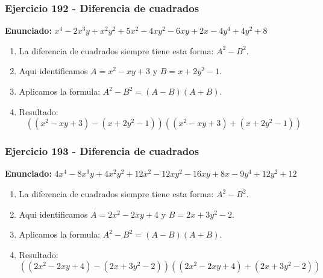 \documentclass[11pt,a4paper]{article}
\begin{document}
\vspace{0.2cm}
\subsubsection*{Ejercicio 192 - Diferencia de cuadrados}
\textbf{Enunciado:} $ x^{4} - 2 x^{3} y + x^{2} y^{2} + 5 x^{2} - 4 x y^{2} - 6 x y + 2 x - 4 y^{4} + 4 y^{2} + 8 $\par
\begin{enumerate}[leftmargin=2em]
\item La diferencia de cuadrados siempre tiene esta forma: \(A^2-B^2\).
\item Aqui identificamos \(A=x^{2} - x y + 3\) y \(B=x + 2 y^{2} - 1\).
\item Aplicamos la formula: \(A^2-B^2=(A-B)(A+B)\).
\item Resultado: \[\boxed{\left(\left(x^{2} - x y + 3\right)-\left(x + 2 y^{2} - 1\right)\right)\left(\left(x^{2} - x y + 3\right)+\left(x + 2 y^{2} - 1\right)\right)}\]
\end{enumerate}

\vspace{0.2cm}
\subsubsection*{Ejercicio 193 - Diferencia de cuadrados}
\textbf{Enunciado:} $ 4 x^{4} - 8 x^{3} y + 4 x^{2} y^{2} + 12 x^{2} - 12 x y^{2} - 16 x y + 8 x - 9 y^{4} + 12 y^{2} + 12 $\par
\begin{enumerate}[leftmargin=2em]
\item La diferencia de cuadrados siempre tiene esta forma: \(A^2-B^2\).
\item Aqui identificamos \(A=2 x^{2} - 2 x y + 4\) y \(B=2 x + 3 y^{2} - 2\).
\item Aplicamos la formula: \(A^2-B^2=(A-B)(A+B)\).
\item Resultado: \[\boxed{\left(\left(2 x^{2} - 2 x y + 4\right)-\left(2 x + 3 y^{2} - 2\right)\right)\left(\left(2 x^{2} - 2 x y + 4\right)+\left(2 x + 3 y^{2} - 2\right)\right)}\]
\end{enumerate}

\vspace{0.2cm}
\end{document}
